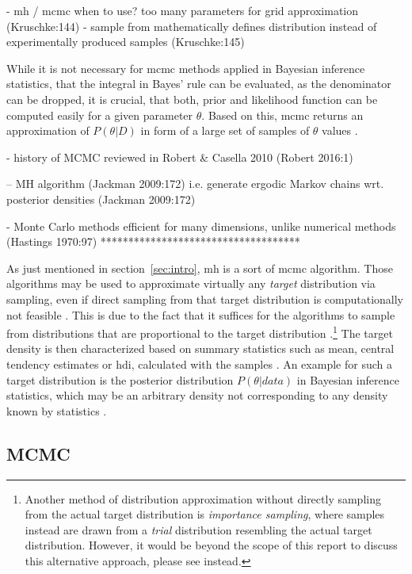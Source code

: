 \documentclass[11pt]{article}
\begin{document}
- mh / mcmc when to use? too many parameters for grid approximation (Kruschke:144)
- sample from mathematically defines distribution instead of experimentally produced samples (Kruschke:145)

While it is not necessary for \gls{mcmc} methods applied in Bayesian inference statistics, that the integral in Bayes' rule can be evaluated, as the denominator can be dropped, it is crucial, that both, prior and likelihood function can be computed easily for a given parameter $\theta$. Based on this, \gls{mcmc} returns an approximation of $P(\theta|D)$ in form of a large set of samples of $\theta$ values \parencite[][144]{kruschke2014}.


- history of MCMC reviewed in Robert \& Casella 2010 (Robert 2016:1)

-- MH algorithm (Jackman 2009:172)
i.e. generate ergodic Markov chains  wrt. posterior densities  (Jackman 2009:172)

- Monte Carlo methods efficient for many dimensions, unlike numerical methods (Hastings 1970:97)
************************************

As just mentioned in section~\ref{sec:intro}, \gls{mh} is a sort of \gls{mcmc} algorithm. 
Those algorithms may be used to approximate virtually any \textit{target} distribution via sampling, even if direct sampling from that target distribution is computationally not feasible \parencite[][105]{liu2001}. This is due to the fact that it suffices for the algorithms to sample from distributions that are proportional to the target distribution \parencite[][140]{jackman2009}.\footnote{Another method of distribution approximation without directly sampling from the actual target distribution is \textit{importance sampling}, where samples instead are drawn from a \textit{trial} distribution resembling the actual target distribution. However, it would be beyond the scope of this report to discuss this alternative approach, please see \textcite{liu2001,jackman2009,hastings1970} instead.} The target density is then characterized based on summary statistics such as mean, central tendency estimates or \gls{hdi}, calculated with the samples \parencite[][145]{kruschke2014}. 
An example for such a target distribution is the posterior distribution $P(\theta|data)$ in Bayesian inference statistics, which may be an arbitrary density not corresponding to any density known by statistics \parencite[][153]{jackman2009}.  


\subsection{MCMC}
\end{document}
